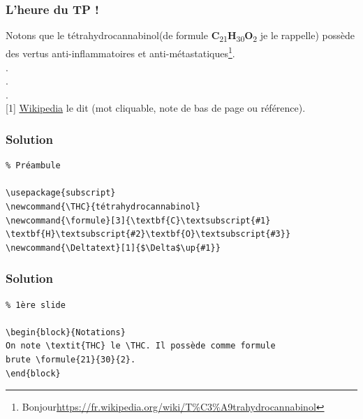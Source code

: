 \documentclass[handout]{beamer}
\newcommand{\THC}{tétrahydrocannabinol}
\newcommand{\formule}[3]{\textbf{C}\textsubscript{#1}\textbf{H}\textsubscript{#2}\textbf{O}\textsubscript{#3}}
\newcommand{\Deltatext}[1]{$\Delta$\up{#1}}
\begin{document}
\begin{frame}
\frametitle{L'heure du TP !}
Notons que le \THC \hspace{0.1cm}(de formule \formule{21}{30}{2} je le rappelle) possède des vertus anti-inflammatoires et anti-métastatiques\footnote{Bonjour\url{https://fr.wikipedia.org/wiki/T\%C3\%A9trahydrocannabinol}}.\\
.\\
.\\
.\\

[1] \href{https://fr.wikipedia.org/wiki/T\%C3\%A9trahydrocannabinol}{Wikipedia} le dit (mot cliquable, note de bas de page ou référence).

\end{frame}

\begin{frame}[fragile=singleslide]
	\frametitle{Solution}
\begin{verbatim}
% Préambule

\usepackage{subscript}
\newcommand{\THC}{tétrahydrocannabinol}
\newcommand{\formule}[3]{\textbf{C}\textsubscript{#1}
\textbf{H}\textsubscript{#2}\textbf{O}\textsubscript{#3}}
\newcommand{\Deltatext}[1]{$\Delta$\up{#1}}
\end{verbatim}
	
\end{frame}

\begin{frame}[fragile=singleslide]
\frametitle{Solution}
\begin{verbatim}
% 1ère slide

\begin{block}{Notations}
On note \textit{THC} le \THC. Il possède comme formule 
brute \formule{21}{30}{2}.
\end{block}
\end{verbatim}

\end{frame}
\end{document}
